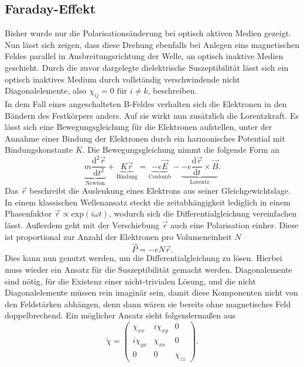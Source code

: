 \subsection{Faraday-Effekt}
Bisher wurde nur die Polarisationsänderung bei optisch aktiven Medien gezeigt. Nun lässt sich zeigen, dass diese Drehung ebenfalls bei Anlegen eins magnetischen Feldes parallel in Ausbreitungsrichtung der Welle,
an optisch inaktive Medien geschieht. Durch die zuvor dargelegte dielektrische Suszeptibilität lässt sich ein optisch inaktives Medium durch vollständig verschwindende
nicht Diagonalelemente, also $\chi_{ij} = 0 \text{ für }i \neq k$, beschreiben.
\\
In dem Fall eines angeschalteten B-Feldes verhalten sich die Elektronen in den Bändern des Festkörpers anders. Auf sie wirkt nun zusätzlich die Lorentzkraft.
Es lässt sich eine Bewegungsgleichung für die Elektronen aufstellen, unter der Annahme einer Bindung der Elektronen durch ein harmonisches Potential mit Bindungskonstante
$K$. Die Bewegungsgleichung nimmt die folgende Form an 
\begin{equation}
\underbrace{m \frac{\text{d}^2\vec{r}}{\text{d}t^2}}_{\text{Newton}} + \underbrace{K\vec{r}}_{\text{Bindung}} = \underbrace{-e \vec{E}}_{\text{Coulomb}} - \underbrace{-e \frac{\text{d}\vec{r}}{\text{d}t} \times \vec{B}}_{\text{Lorentz}}.
\end{equation}
Das $\vec{r}$ beschreibt die Auslenkung eines Elektrons aus seiner Gleichgewichtslage. In einem klassischen Wellenansatz steckt die zeitabhängigkeit lediglich in einem Phasenfaktor
$\vec{r} \propto \text{exp}(i\omega t)$, wodurch sich die Differentialgleichung vereinfachen lässt.
Außerdem geht mit der Verschiebung $\vec{r}$ auch eine Polarisation einher. Diese ist proportional zur Anzahl der Elektronen pro Volumeneinheit $N$
\begin{equation}
\vec{P} = - e N\vec{r}.
\end{equation}
Dies kann nun genutzt werden, um die Differentialgleichung zu lösen. Hierbei muss wieder ein Ansatz für die Suszeptibilität gemacht werden. Diagonalemente sind nötig, für die Existenz
einer nicht-trivialen Lösung, und die nicht Diagonalelemente müssen rein imaginär sein, damit diese Komponenten nicht von den Feldstärken abhängen, denn dann wären sie bereits ohne 
magnetisches Feld doppelbrechend.
Ein möglicher Ansatz sieht folgendermaßen aus 
\begin{equation}
    \tilde{\chi} = \begin{pmatrix}
        \chi_{xx} & i\chi_{xy} & 0 \\
        i\chi_{yx} & \chi_{xx} & 0 \\
        0 & 0 & \chi_{zz}
        \end{pmatrix}.
\end{equation}
